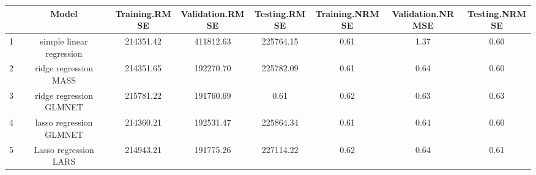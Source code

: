 % 
\begin{tabular}{cccccccc}
  \hline
 & Model & Training.RMSE & Validation.RMSE & Testing.RMSE & Training.NRMSE & Validation.NRMSE & Testing.NRMSE \\ 
  \hline
1 & simple linear regression & 214351.42 & 411812.63 & 225764.15 & 0.61 & 1.37 & 0.60 \\ 
  2 & ridge regression MASS & 214351.65 & 192270.70 & 225782.09 & 0.61 & 0.64 & 0.60 \\ 
  3 & ridge regression GLMNET & 215781.22 & 191760.69 & 0.61 & 0.62 & 0.63 & 0.63 \\ 
  4 & lasso regression GLMNET & 214360.21 & 192531.47 & 225864.34 & 0.61 & 0.64 & 0.60 \\ 
  5 & Lasso regression LARS & 214943.21 & 191775.26 & 227114.22 & 0.62 & 0.64 & 0.61 \\ 
   \hline
\end{tabular}
